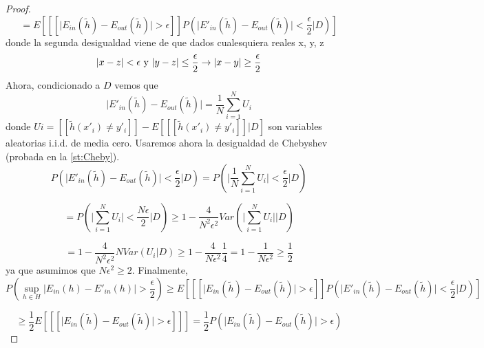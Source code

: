 \begin{proof}
\[ = E \left[ [[\vert E_{in}(\tilde{h})-E_{out}(\tilde{h}) \vert > \epsilon ]] P \left( \vert E'_{in}(\tilde{h})-E_{out}(\tilde{h}) \vert < \frac{\epsilon}{2}  \bigg\vert D \right) \right] \]
donde la segunda desigualdad viene de que dados cualesquiera reales x, y, z
\[ \vert x-z\vert < \epsilon \textnormal{ y } \vert y-z\vert \leq \frac{\epsilon}{2} \rightarrow \vert x-y\vert \geq \frac{\epsilon}{2} \]
Ahora, condicionado a $D$ vemos que
\[ \vert E'_{in}(\tilde{h})-E_{out}(\tilde{h}) \vert = \frac{1}{N}\sum_{i=1}^{N}U_{i} \]
donde $U{i}=[[ \tilde{h}(x'_{i}) \neq y'_{i} ]]-E\left[ [[ \tilde{h}(x'_{i}) \neq y'_{i} ]] \vert D \right]$ son variables aleatorias i.i.d. de media cero. Usaremos ahora la desigualdad de Chebyshev (probada en la \autoref{st:Cheby}).
\[ P \left( \vert E'_{in}(\tilde{h})-E_{out}(\tilde{h}) \vert < \frac{\epsilon}{2}  \bigg\vert D \right) = P \left( \vert \frac{1}{N}\sum_{i=1}^{N}U_{i} \vert < \frac{\epsilon}{2}  \bigg\vert D \right) \]

\[ = P \left( \vert \sum_{i=1}^{N}U_{i} \vert < \frac{N\epsilon}{2}  \bigg\vert D \right) \geq 1- \frac{4}{N^{2}\epsilon^{2}} Var \left( \vert \sum_{i=1}^{N}U_{i} \vert \bigg\vert D  \right) \]

\[ = 1- \frac{4}{N^{2}\epsilon^{2}}N Var \left( U_{i}\vert D  \right) \geq 1- \frac{4}{N\epsilon^{2}} \frac{1}{4} = 1- \frac{1}{N\epsilon^{2}} \geq \frac{1}{2} \]
ya que asumimos que $N\epsilon^{2} \geq 2$. Finalmente,
\[ P \left( \sup_{h \in H} \vert E_{in}(h)-E'_{in}(h) \vert >\frac{\epsilon}{2} \right) \geq E \left[ [[\vert E_{in}(\tilde{h})-E_{out}(\tilde{h}) \vert > \epsilon ]] P \left( \vert E'_{in}(\tilde{h})-E_{out}(\tilde{h}) \vert < \frac{\epsilon}{2}  \bigg\vert D \right) \right] \]

\[ \geq \frac{1}{2} E \left[ [[\vert E_{in}(\tilde{h})-E_{out}(\tilde{h}) \vert > \epsilon ]] \right] = \frac{1}{2} P \left( \vert E_{in}(\tilde{h})-E_{out}(\tilde{h}) \vert > \epsilon  \right)\]


\end{proof}
